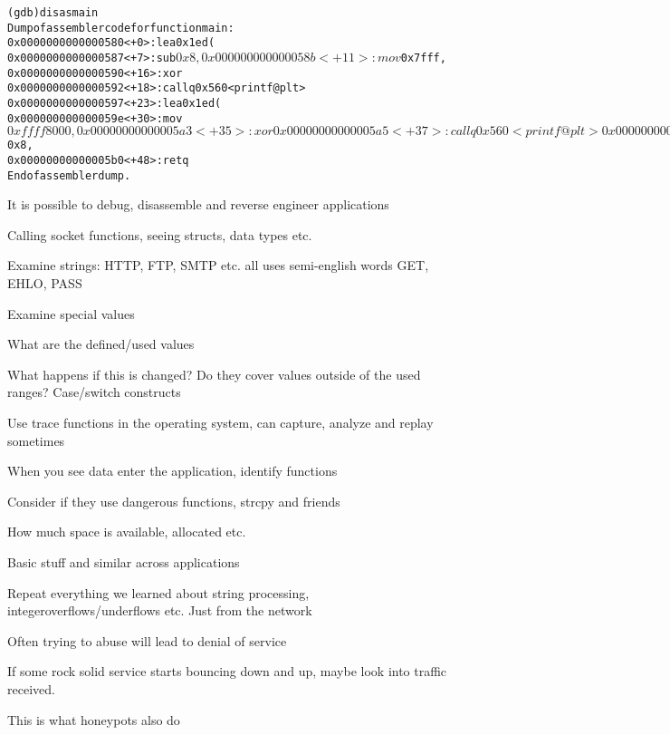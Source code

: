 \documentclass[Screen16to9,17pt]{foils}
\begin{document}

\begin{alltt}\footnotesize
  (gdb) disas main
  Dump of assembler code for function main:
     0x0000000000000580 <+0>:	lea    0x1ed(%rip),%rdi        # 0x774
     0x0000000000000587 <+7>:	sub    $0x8,%rsp
     0x000000000000058b <+11>:	mov    $0x7fff,%esi
     0x0000000000000590 <+16>:	xor    %eax,%eax
     0x0000000000000592 <+18>:	callq  0x560 <printf@plt>
     0x0000000000000597 <+23>:	lea    0x1ed(%rip),%rdi        # 0x78b
     0x000000000000059e <+30>:	mov    $0xffff8000,%esi
     0x00000000000005a3 <+35>:	xor    %eax,%eax
     0x00000000000005a5 <+37>:	callq  0x560 <printf@plt>
     0x00000000000005aa <+42>:	xor    %eax,%eax
     0x00000000000005ac <+44>:	add    $0x8,%rsp
     0x00000000000005b0 <+48>:	retq
  End of assembler dump.
\end{alltt}

\begin{list2}
\item It is possible to debug, disassemble and reverse engineer applications
\item Calling socket functions, seeing structs, data types etc.
\item Examine strings: HTTP, FTP, SMTP etc. all uses semi-english words GET, EHLO, PASS
\end{list2}



\begin{list2}
\item Examine special values
\item What are the defined/used values
\item What happens if this is changed? Do they cover values outside of the used ranges? Case/switch constructs
\item Use trace functions in the operating system, can capture, analyze and replay sometimes
\end{list2}



\begin{list2}
\item When you see data enter the application, identify functions
\item Consider if they use dangerous functions, strcpy and friends
\item How much space is available, allocated etc.
\item Basic stuff and similar across applications
\vskip 2cm
\item Repeat everything we learned about string processing, integeroverflows/underflows etc. Just from the network
\item Often trying to abuse will lead to denial of service
\vskip 1cm
\item If some rock solid service starts bouncing down and up, maybe look into traffic received.
\item This is what honeypots also do
\end{list2}
\end{document}
